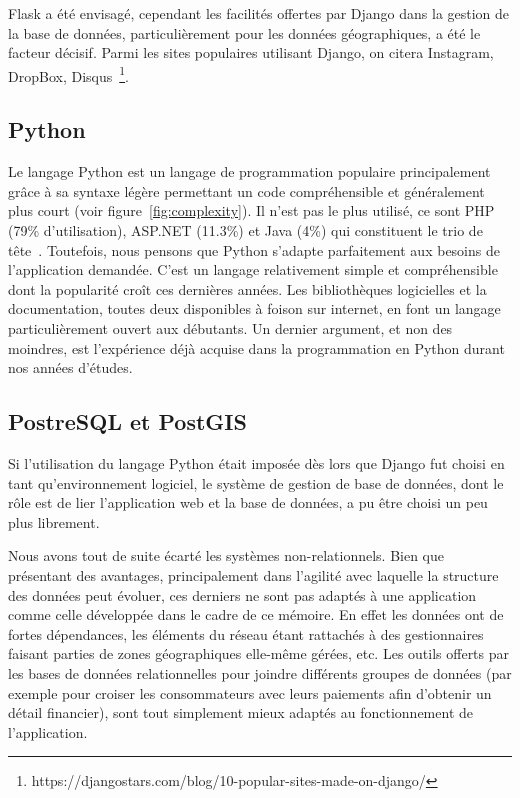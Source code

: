 \documentclass{EPL-master-thesis-covers-FR}
\begin{document}
					Flask a été envisagé, cependant les facilités offertes par Django dans la gestion de la base de données, particulièrement pour les données géographiques, a été le facteur décisif. Parmi les sites populaires utilisant Django, on citera Instagram, DropBox, Disqus~\footnote{https://djangostars.com/blog/10-popular-sites-made-on-django/}.

			\subsection*{Python}
				Le langage Python est un langage de programmation populaire principalement grâce à sa syntaxe légère permettant un code compréhensible et généralement plus court (voir figure~\ref{fig:complexity}). Il n'est pas le plus utilisé, ce sont PHP (79\% d'utilisation), ASP.NET (11.3\%) et Java (4\%) qui constituent le trio de tête~\cite{ref:popular_programming_languages}. Toutefois, nous pensons que Python s'adapte parfaitement aux besoins de l'application demandée. C'est un langage relativement simple et compréhensible dont la popularité croît ces dernières années. Les bibliothèques logicielles et la documentation, toutes deux disponibles à foison sur internet, en font un langage particulièrement ouvert aux débutants. Un dernier argument, et non des moindres, est l'expérience déjà acquise dans la programmation en Python durant nos années d'études.

			\subsection*{PostreSQL et PostGIS}

				Si l'utilisation du langage Python était imposée dès lors que Django fut choisi en tant qu'environnement logiciel, le système de gestion de base de données, dont le rôle est de lier l'application web et la base de données, a pu être choisi un peu plus librement.

				Nous avons tout de suite écarté les systèmes non-relationnels. Bien que présentant des avantages, principalement dans l'agilité avec laquelle la structure des données peut évoluer, ces derniers ne sont pas adaptés à une application comme celle développée dans le cadre de ce mémoire. En effet les données ont de fortes dépendances, les éléments du réseau étant rattachés à des gestionnaires faisant parties de zones géographiques elle-même gérées, etc. Les outils offerts par les bases de données relationnelles pour joindre différents groupes de données (par exemple pour croiser les consommateurs avec leurs paiements afin d'obtenir un détail financier), sont tout simplement mieux adaptés au fonctionnement de l'application.
\end{document}
